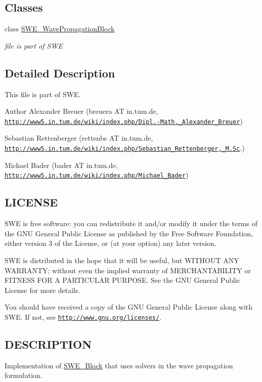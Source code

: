 \subsection*{Classes}
\begin{DoxyCompactItemize}
\item 
class \hyperlink{classSWE__WavePropagationBlock}{S\+W\+E\+\_\+\+Wave\+Propagation\+Block}
\begin{DoxyCompactList}\small\item\em file is part of S\+WE \end{DoxyCompactList}\end{DoxyCompactItemize}


\subsection{Detailed Description}
This file is part of S\+WE.

\begin{DoxyAuthor}{Author}
Alexander Breuer (breuera AT in.\+tum.\+de, \href{http://www5.in.tum.de/wiki/index.php/Dipl.-Math._Alexander_Breuer}{\tt http\+://www5.\+in.\+tum.\+de/wiki/index.\+php/\+Dipl.-\/\+Math.\+\_\+\+Alexander\+\_\+\+Breuer}) 

Sebastian Rettenberger (rettenbs AT in.\+tum.\+de, \href{http://www5.in.tum.de/wiki/index.php/Sebastian_Rettenberger,_M.Sc}{\tt http\+://www5.\+in.\+tum.\+de/wiki/index.\+php/\+Sebastian\+\_\+\+Rettenberger,\+\_\+\+M.\+Sc}.) 

Michael Bader (bader AT in.\+tum.\+de, \href{http://www5.in.tum.de/wiki/index.php/Michael_Bader}{\tt http\+://www5.\+in.\+tum.\+de/wiki/index.\+php/\+Michael\+\_\+\+Bader})
\end{DoxyAuthor}
\hypertarget{help_8hh_LICENSE}{}\subsection{L\+I\+C\+E\+N\+SE}\label{help_8hh_LICENSE}
S\+WE is free software\+: you can redistribute it and/or modify it under the terms of the G\+NU General Public License as published by the Free Software Foundation, either version 3 of the License, or (at your option) any later version.

S\+WE is distributed in the hope that it will be useful, but W\+I\+T\+H\+O\+UT A\+NY W\+A\+R\+R\+A\+N\+TY; without even the implied warranty of M\+E\+R\+C\+H\+A\+N\+T\+A\+B\+I\+L\+I\+TY or F\+I\+T\+N\+E\+SS F\+OR A P\+A\+R\+T\+I\+C\+U\+L\+AR P\+U\+R\+P\+O\+SE. See the G\+NU General Public License for more details.

You should have received a copy of the G\+NU General Public License along with S\+WE. If not, see \href{http://www.gnu.org/licenses/}{\tt http\+://www.\+gnu.\+org/licenses/}.\hypertarget{help_8hh_DESCRIPTION}{}\subsection{D\+E\+S\+C\+R\+I\+P\+T\+I\+ON}\label{help_8hh_DESCRIPTION}
Implementation of \hyperlink{classSWE__Block}{S\+W\+E\+\_\+\+Block} that uses solvers in the wave propagation formulation. 